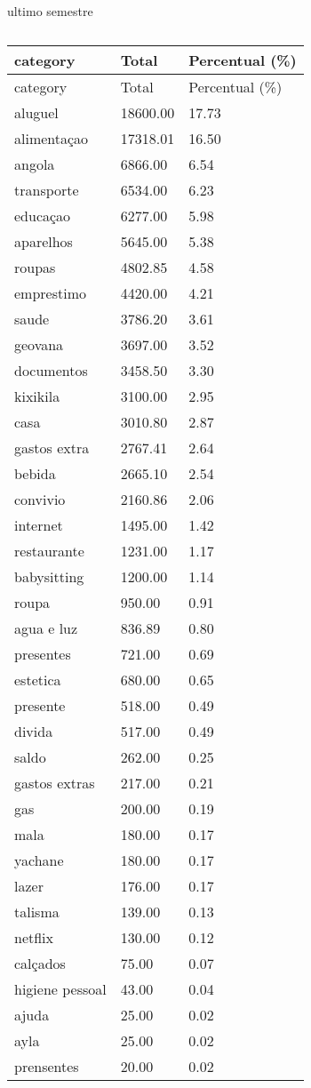\documentclass[
  8pt,
  a4paper,
  DIV=11,
  numbers=noendperiod]{scrartcl}
\begin{document}
\begin{figure}
\begin{minipage}{0.50\linewidth}
\end{minipage}%
%
\begin{minipage}{0.50\linewidth}
ultimo semestre

\begin{longtable}[]{@{}lll@{}}
\caption{}\label{T_cab28}\tabularnewline
\toprule\noalign{}
category & Total & Percentual (\%) \\
\midrule\noalign{}
\endfirsthead
\toprule\noalign{}
category & Total & Percentual (\%) \\
\midrule\noalign{}
\endhead
\bottomrule\noalign{}
\endlastfoot
aluguel & 18600.00 & 17.73 \\
alimentaçao & 17318.01 & 16.50 \\
angola & 6866.00 & 6.54 \\
transporte & 6534.00 & 6.23 \\
educaçao & 6277.00 & 5.98 \\
aparelhos & 5645.00 & 5.38 \\
roupas & 4802.85 & 4.58 \\
emprestimo & 4420.00 & 4.21 \\
saude & 3786.20 & 3.61 \\
geovana & 3697.00 & 3.52 \\
documentos & 3458.50 & 3.30 \\
kixikila & 3100.00 & 2.95 \\
casa & 3010.80 & 2.87 \\
gastos extra & 2767.41 & 2.64 \\
bebida & 2665.10 & 2.54 \\
convivio & 2160.86 & 2.06 \\
internet & 1495.00 & 1.42 \\
restaurante & 1231.00 & 1.17 \\
babysitting & 1200.00 & 1.14 \\
roupa & 950.00 & 0.91 \\
agua e luz & 836.89 & 0.80 \\
presentes & 721.00 & 0.69 \\
estetica & 680.00 & 0.65 \\
presente & 518.00 & 0.49 \\
divida & 517.00 & 0.49 \\
saldo & 262.00 & 0.25 \\
gastos extras & 217.00 & 0.21 \\
gas & 200.00 & 0.19 \\
mala & 180.00 & 0.17 \\
yachane & 180.00 & 0.17 \\
lazer & 176.00 & 0.17 \\
talisma & 139.00 & 0.13 \\
netflix & 130.00 & 0.12 \\
calçados & 75.00 & 0.07 \\
higiene pessoal & 43.00 & 0.04 \\
ajuda & 25.00 & 0.02 \\
ayla & 25.00 & 0.02 \\
prensentes & 20.00 & 0.02 \\
\end{longtable}


\end{minipage}
\end{figure}
\end{document}
